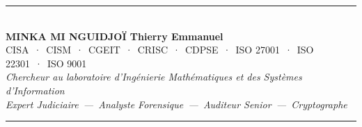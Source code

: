 \documentclass[12pt, a4paper, twoside, openright]{book}
\begin{document}
\vfill

\begin{center}
    {\color{CouleurAccent}\rule{0.7\linewidth}{1.2pt}}\\[1.2ex]
    {\color{white}\large\bfseries MINKA MI NGUIDJOÏ Thierry Emmanuel}\\[0.4ex]
    {\color{white!80!gray}\small
        CISA~·~CISM~·~CGEIT~·~CRISC~·~CDPSE~·~ISO 27001~·~ISO 22301~·~ISO 9001}\\[0.3ex]
    {\color{white!70!gray}\footnotesize\itshape
        Chercheur au laboratoire d'Ingénierie Mathématiques et des Systèmes d'Information}\\[0.3ex]
    {\color{white!70!gray}\footnotesize\itshape
        Expert Judiciaire~—~Analyste Forensique~—~Auditeur Senior~—~Cryptographe}\\[1.2ex]
    {\color{CouleurAccent}\rule{0.7\linewidth}{1.2pt}}
\end{center}

\vspace{1cm}

\afterpage{\nopagecolor}
\end{document}
